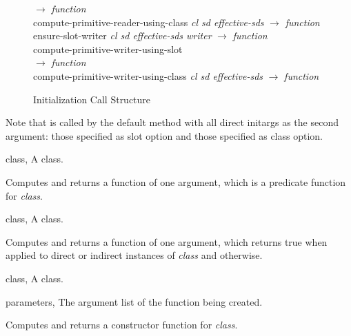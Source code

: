 \begin{optDefinition}
\begin{figure*}[t]
\begin{center}
\begin{minipage}[t]{\textwidth}
{\begin{tabbing}
  \>  \>  \>                       $\rightarrow$ {\em function}\\
  \>  \>  \>compute-primitive-reader-using-class {\em cl sd effective-sds\/} $\rightarrow$ {\em function}\\
  \>ensure-slot-writer {\em cl sd effective-sds writer\/} $\rightarrow$ {\em function}\\
  \>  \>compute-primitive-writer-using-slot\\
  \>  \>  \>                       $\rightarrow$ {\em function}\\
  \>  \>  \>compute-primitive-writer-using-class {\em cl sd effective-sds\/} $\rightarrow$ {\em function}\\
\end{tabbing}}
\end{minipage}\end{center}
\caption{Initialization Call Structure}
\label{call-structure}
\end{figure*}
%
Note that  is called by the default
 method with all direct initargs as the second argument:
those specified as slot option and those specified as class option.

%
\begin{genericargs}
    \item[class, \classref{class}] A class.
\end{genericargs}
%
\result%
Computes and returns a function of one argument, which is a predicate
function for {\em class}.

%
\begin{specargs}
    \item[class, \classref{class}] A class.
\end{specargs}
%
\result%
Computes and returns a function of one argument, which returns true when applied
to direct or indirect instances of {\em class} and \nil\/ otherwise.

%
\begin{genericargs}
    \item[class, \classref{class}] A class.
    \item[parameters, \classref{list}] The argument list of the function being
    created.
\end{genericargs}
%
\result%
Computes and returns a constructor function for {\em class}.


\end{optDefinition}
